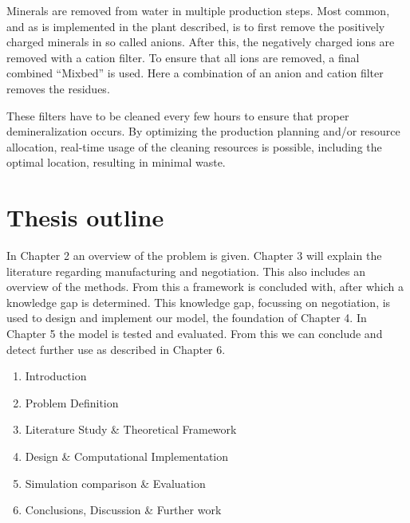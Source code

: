 Minerals are removed from water in multiple production steps. Most common, and as is implemented in the plant described, is to first remove the positively charged minerals in so called anions. After this, the negatively charged ions are removed with a cation filter. To ensure that all ions are removed, a final combined ``Mixbed'' is used. Here a combination of an anion and cation filter removes the residues.

These filters have to be cleaned every few hours to ensure that proper demineralization occurs. By optimizing the production planning and/or resource allocation, real-time usage of the cleaning resources is possible, including the optimal location, resulting in minimal waste.

\section{Thesis outline}
In Chapter 2 an overview of the problem is given. Chapter 3 will explain the literature regarding manufacturing and negotiation. This also includes an overview of the methods. From this a framework is concluded with, after which a knowledge gap is determined. This knowledge gap, focussing on negotiation, is used to design and implement our model, the foundation of Chapter 4. In Chapter 5 the model is tested and evaluated. From this we can conclude and detect further use as described in Chapter 6.
\begin{enumerate}
	
	\item
	Introduction 
	\item
	Problem Definition 
	\item
	Literature Study \& Theoretical Framework
	\item
	Design \& Computational Implementation
	\item
	Simulation comparison \& Evaluation
	\item
	Conclusions, Discussion \& Further work
\end{enumerate}

